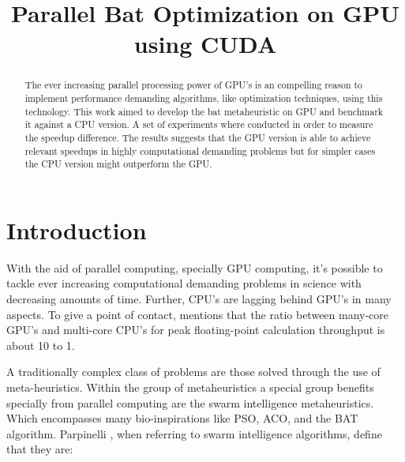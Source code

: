 \documentclass[conference]{IEEEtran}
\begin{document}
\title{Parallel Bat Optimization on GPU using CUDA}

\author{
\and
{}
}

\maketitle

\begin{abstract}
The ever increasing parallel processing power of GPU's is an compelling
reason to implement performance demanding algorithms, like optimization
techniques, using this technology. This work aimed to develop the bat
metaheuristic on GPU and benchmark it against a CPU version. A set of
experiments where conducted in order to measure the speedup difference.
The results suggests that the GPU version is able to achieve relevant
speedups in highly computational demanding problems but for simpler cases
the CPU version might outperform the GPU.
\end{abstract}

\IEEEpeerreviewmaketitle

\section{Introduction} %

With the aid of parallel computing, specially GPU computing, it's
possible to tackle ever increasing computational demanding problems in science
with decreasing amounts of time. Further, CPU's are lagging behind GPU's in
many aspects. To give a point of contact, \cite{programmingProcessors}
mentions that the ratio between many-core GPU's and multi-core CPU's for
peak floating-point calculation throughput is about 10 to 1.

A traditionally complex class of problems are those solved through
the use of meta-heuristics. Within the group of metaheuristics a
special group benefits specially from parallel computing are the swarm
intelligence metaheuristics. Which encompasses many bio-inspirations
like PSO, ACO, and the BAT algorithm. Parpinelli
\cite{newInspirations}, when referring to swarm intelligence algorithms,
define that they are:
\end{document}
